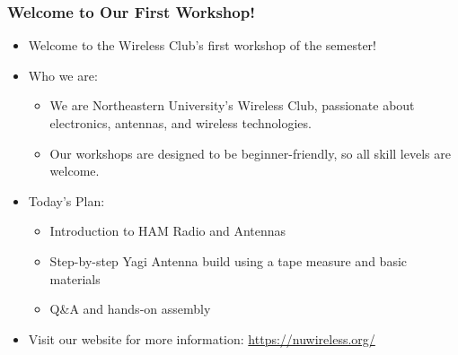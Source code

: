\documentclass{beamer}
\begin{document}
\begin{frame}
    \frametitle{Welcome to Our First Workshop!}
    \begin{itemize}
        \item Welcome to the Wireless Club's first workshop of the semester!
        \item Who we are:
        \begin{itemize}
            \item We are Northeastern University's Wireless Club, passionate about electronics, antennas, and wireless technologies.
            \item Our workshops are designed to be beginner-friendly, so all skill levels are welcome.
        \end{itemize}
        \item Today’s Plan:
        \begin{itemize}
            \item Introduction to HAM Radio and Antennas
            \item Step-by-step Yagi Antenna build using a tape measure and basic materials
            \item Q&A and hands-on assembly
        \end{itemize}
        \item Visit our website for more information: \url{https://nuwireless.org/}
    \end{itemize}
\end{frame}
\end{document}
